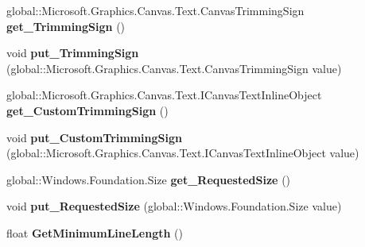 \begin{DoxyCompactItemize}
global\+::\+Microsoft.\+Graphics.\+Canvas.\+Text.\+Canvas\+Trimming\+Sign {\bfseries get\+\_\+\+Trimming\+Sign} ()
\item 
\mbox{\label{class_microsoft_1_1_graphics_1_1_canvas_1_1_text_1_1_canvas_text_layout_a6038b04e1633c19a344323c3adb9048c}} 
void {\bfseries put\+\_\+\+Trimming\+Sign} (global\+::\+Microsoft.\+Graphics.\+Canvas.\+Text.\+Canvas\+Trimming\+Sign value)
\item 
\mbox{\label{class_microsoft_1_1_graphics_1_1_canvas_1_1_text_1_1_canvas_text_layout_a5dc8d39fbd74051d1f66f159c55ef5f3}} 
global\+::\+Microsoft.\+Graphics.\+Canvas.\+Text.\+I\+Canvas\+Text\+Inline\+Object {\bfseries get\+\_\+\+Custom\+Trimming\+Sign} ()
\item 
\mbox{\label{class_microsoft_1_1_graphics_1_1_canvas_1_1_text_1_1_canvas_text_layout_a31d76ac5905938caf13ffb5911f8303a}} 
void {\bfseries put\+\_\+\+Custom\+Trimming\+Sign} (global\+::\+Microsoft.\+Graphics.\+Canvas.\+Text.\+I\+Canvas\+Text\+Inline\+Object value)
\item 
\mbox{\label{class_microsoft_1_1_graphics_1_1_canvas_1_1_text_1_1_canvas_text_layout_adebf612a8df4663884f5d4a38f41ea39}} 
global\+::\+Windows.\+Foundation.\+Size {\bfseries get\+\_\+\+Requested\+Size} ()
\item 
\mbox{\label{class_microsoft_1_1_graphics_1_1_canvas_1_1_text_1_1_canvas_text_layout_a2f3f911ee1fbeb9d18674696d30e71ad}} 
void {\bfseries put\+\_\+\+Requested\+Size} (global\+::\+Windows.\+Foundation.\+Size value)
\item 
\mbox{\label{class_microsoft_1_1_graphics_1_1_canvas_1_1_text_1_1_canvas_text_layout_a238de0e21932bea51610979705559db4}} 
float {\bfseries Get\+Minimum\+Line\+Length} ()
\item 
\mbox{\label{class_microsoft_1_1_graphics_1_1_canvas_1_1_text_1_1_canvas_text_layout_a0c810e107e704b45bc815cf10ec80e67}} 

\end{DoxyCompactItemize}

